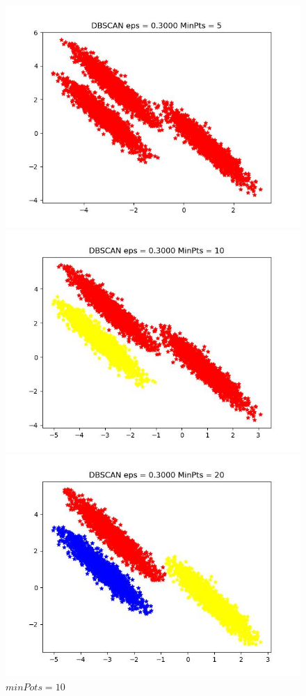 \documentclass[UTF8]{ctexart}
\begin{document}
\begin{figure}[H]
	\centering
	\begin{minipage}{0.32\linewidth}
		\centering
		\includegraphics[width=0.9\linewidth]{data3-5.jpg}
		\caption{$minPots=5$}
		\label{chutian1}%
	\end{minipage}
	\begin{minipage}{0.32\linewidth}
		\centering
		\includegraphics[width=0.9\linewidth]{data3-10.jpg}
		\caption{$minPots=10$}
		\label{chutian2}%
	\end{minipage}
  \begin{minipage}{0.32\linewidth}
		\centering
		\includegraphics[width=0.9\linewidth]{data3-20.jpg}

\end{minipage}
\end{figure}
\end{document}
